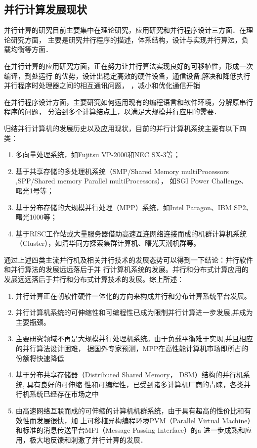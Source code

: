 \subsection{并行计算发展现状}
    并行计算的研究目前主要集中在理论研究，应用研究和并行程序设计三方面．在理论研究方面，
主要是研究并行程序的描述，体系结构，设计与实现并行算法，负载均衡等方面．
    
    在并行计算的应用研究方面，正在努力让并行算法实现良好的可移植性，形成一次编译，到处运行
的优势，设计出稳定高效的硬件设备，通信设备;解决和降低执行并行程序时处理器之间的相互通讯问题，
，减小和优化通信开销

    在并行程序设计方面，主要研究如何运用现有的编程语言和软件环境，分解原串行程序的问题，
分治到多个计算结点上，以满足大规模并行应用的需要．

    归结并行计算机的发展历史以及应用现状，目前的并行计算机系统主要有以下四类：
\begin{enumerate}
\item 多向量处理系统，如Fujitsu VP-2000和NEC SX-3等；

\item 基于共享存储的多处理机系统（SMP/Shared Memory multiProcessors ,SPP/Shared memory Parallel multiProcessors），
如SGI Power Challenge、曙光1号等；

\item 基于分布存储的大规模并行处理（MPP）系统，如Intel Paragon、IBM SP2、曙光1000等；

\item 基于RISC工作站或大量服务器借助高速互连网络连接而成的机群计算机系统（Cluster），如清华同方探索集群计算机、曙光天潮机群等。
\end{enumerate}

通过上述四类主流并行机及相关并行技术的发展态势可以得到一下结论：并行软件和并行算法的发展远远落后于并
行计算机系统的发展。并行和分布式计算应用的发展远远落后于并行和分布式计算技术的发展。综上所述：
\begin{enumerate}
\item 并行计算正在朝软件硬件一体化的方向来构成并行和分布计算系统平台发展。
\item 并行计算机系统的可伸缩性和可编程性已成为限制并行计算进一步发展,并成为主要瓶颈。
\item 主要研究领域不再是大规模并行处理机系统。由于负载平衡难于实现,并且相应的并行算法设计困难，
据国外专家预测，MPP在高性能计算机市场即所占的份额将快速降低
\item 基于分布共享存储器（Distributed Shared Memory， DSM）结构的并行机系统, 具有良好的可伸缩
性和可编程性，已受到诸多计算机厂商的青睐，各类并行机系统已经存在市场之中
\item 由高速网络互联而成的可伸缩的计算机机群系统，由于具有超高的性价比和有效性而发展很快，加
上可移植异构编程环境PVM（Parallel Virtual Machine）和标准的消息传送平台MPI（Message Passing Interface）的a
进一步成熟和应用，极大地反馈和刺激了并行计算的发展．
\end{enumerate}

